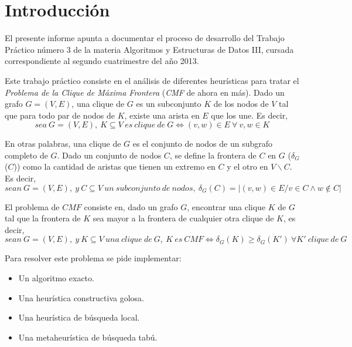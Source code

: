 \section{Introducción}
\par{El presente informe apunta a documentar el proceso de desarrollo del Trabajo
Práctico número 3 de la materia Algoritmos y Estructuras de Datos III, cursada
correspondiente al segundo cuatrimestre del año 2013.}\\

\par{Este trabajo práctico consiste en el análisis de diferentes heurísticas
para tratar el \emph{Problema de la Clique de Máxima Frontera} (\emph{CMF} de
ahora en más). Dado un grafo $G=(V,E)$, una clique de $G$ es un subconjunto $K$
de los nodos de $V$ tal que para todo par de nodos de $K$, existe una arista
en $E$ que los une. Es decir,}
\[
sea\ G = (V,E),\ K \subseteq V\ es\ clique\ de\ G \Leftrightarrow (v,w)
\in E\ \forall\ v,w \in K
\]

\par{En otras palabras, una clique de $G$ es el conjunto de nodos de un
subgrafo completo de $G$. Dado un conjunto de nodos $C$, se define la frontera
de $C$ en $G$ ($\delta_G$($C$)) como la cantidad de aristas que tienen un
extremo en $C$ y el otro en $V\backslash C$. Es decir,}
\[
sean\ G = (V,E),\ y\ C \subseteq V\ un\ subconjunto\ de\ nodos,\ \delta_G(C)
= |{(v,w) \in E / v \in C \land w \notin C}|
\]

\par{El problema de $CMF$ consiste en, dado un grafo $G$, encontrar
una clique $K$ de $G$ tal que la frontera de $K$ sea mayor a la frontera de
cualquier otra clique de $K$, es decir,}
\[
sean\ G = (V,E),\ y\ K \subseteq V\ una\ clique\ de\ G,\ K\ es\ CMF
\Leftrightarrow \delta_G(K) \geq \delta_G(K')\ \forall K'\ clique\ de\ G
\]




\par{Para resolver este problema se pide implementar:}
\begin{itemize}
\item Un algoritmo exacto.
\item Una heurística constructiva golosa.
\item Una heurística de búsqueda local.
\item Una metaheurística de búsqueda tabú.
\end{itemize} 

